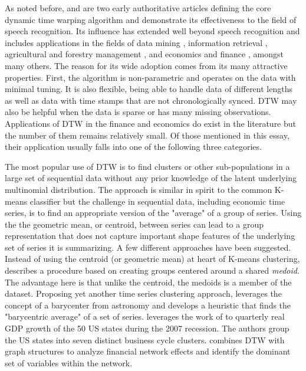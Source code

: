 As noted before, \cite{SakoeChiba_IEEE_1978} and \cite{Itakura_1975} are two early authoritative articles defining the core dynamic time warping algorithm and demonstrate its effectiveness to the field of speech recognition. Its influence has extended well beyond speech recognition and includes applications in the fields of data mining \cite{Berndt1994, ElsingAgon2012, KotsifakosAthitsosPapapetrou_2011}, information retrieval \cite{Mueller2007}, agricultural and forestry management \cite{Chaves_et_all_2021_Brazil_Crop_id, Maus_et_al_2016, NarinO.G.2022URAN, QuXuzhou2023Mmls, XiaoXingyuan2023LCCU}, and economics and finance \cite{9145837_Entropic_DTW_Fin_Networks, Urso_et_al_2021, FrancesWiemann2020, HowardTalisAlexeev_2020, Ito_Sakemoto_2020, Mastroeni_et_al_2021, Raihan2017, WAN2017151, WangXieHanSun2012}, amongst many others. The reason for its wide adoption comes from its many attractive properties. First, the algorithm is non-parametric and operates on the data with minimal tuning. It is also flexible, being able to handle data of different lengths as well as data with time stamps that are not chronologically synced. DTW may also be helpful when the data is sparse or has many missing observations. Applications of DTW in the finance and economics do exist in the literature but the number of them remains relatively small. Of those mentioned in this essay, their application usually falls into one of the following three categories.

The most popular use of DTW is to find clusters or other sub-populations in a large set of sequential data without any prior knowledge of the latent underlying multinomial distribution. The approach is similar in spirit to the common K-means classifier but the challenge in sequential data, including economic time series, is to find an appropriate version of the "average" of a group of series. Using the the geometric mean, or centroid, between series can lead to a group representation that does not capture important shape features of the underlying set of series it is summarizing. A few different approaches have been suggested. Instead of using the centroid (or geometric mean) at heart of K-means clustering, \cite{Urso_et_al_2021} describes a procedure based on creating groups centered around a shared \textit{medoid}. The advantage here is that unlike the centroid, the medoids is a member of the dataset. Proposing yet another time series clustering approach, \cite{PETITJEAN2011678} leverages the concept of a barycenter from astronomy and develops a heuristic that finds the "barycentric average" of a set of series. \cite{FrancesWiemann2020} leverages the work of \cite{PETITJEAN2011678} to quarterly real GDP growth of the 50 US states during the 2007 recession. The authors group the US states into seven distinct business cycle clusters. \cite{9145837_Entropic_DTW_Fin_Networks} combines DTW with graph structures to analyze financial network effects and identify the dominant set of variables within the network.

